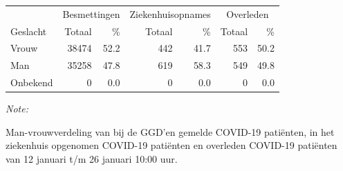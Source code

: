 \documentclass[
  english,
  man,floatsintext]{apa6}
\begin{document}
\begin{table}[H]
\centering\begingroup\fontsize{11}{13}\selectfont

\begin{threeparttable}
\begin{tabular}{lrrrrrr}
\toprule
\multicolumn{1}{c}{ } & \multicolumn{2}{c}{Besmettingen} & \multicolumn{2}{c}{Ziekenhuisopnames} & \multicolumn{2}{c}{Overleden} \\
\cmidrule(l{3pt}r{3pt}){2-3} \cmidrule(l{3pt}r{3pt}){4-5} \cmidrule(l{3pt}r{3pt}){6-7}
Geslacht & Totaal & \% & Totaal & \% & Totaal & \%\\
\midrule
Vrouw & 38474 & 52.2 & 442 & 41.7 & 553 & 50.2\\
Man & 35258 & 47.8 & 619 & 58.3 & 549 & 49.8\\
Onbekend & 0 & 0.0 & 0 & 0.0 & 0 & 0.0\\
\bottomrule
\end{tabular}
\begin{tablenotes}
\item \textit{Note: } 
\item Man-vrouwverdeling van bij de GGD’en gemelde COVID-19 patiënten, in het ziekenhuis opgenomen COVID-19 patiënten en overleden COVID-19 patiënten van 12 januari t/m 26 januari 10:00 uur.
\end{tablenotes}
\end{threeparttable}
\endgroup{}
\end{table}
\newpage
\end{document}
